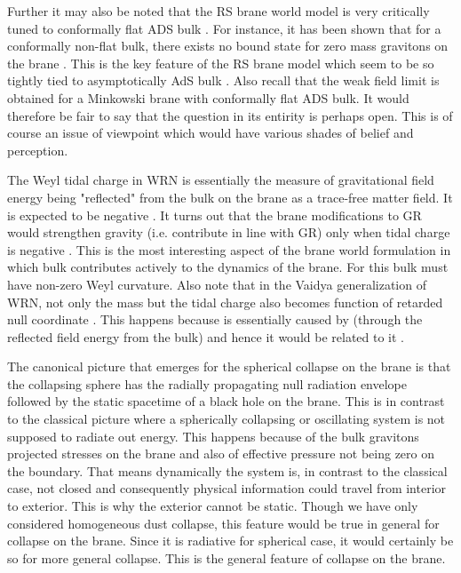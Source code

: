 \documentclass[a4paper,twocolumn,showpacs,preprintnumbers,amsmath,amssymb]{revtex4}
\begin{document}
Further it may also be noted that the RS brane world model is very critically 
tuned to conformally flat ADS\coordHE{} bulk \cite{sd,n9}. For instance, it has 
been shown that for a conformally non-flat bulk, there exists no bound state 
for zero mass gravitons on the brane \cite{sd}. This is the key feature of 
the RS brane model which seem to be so tightly tied to asymptotically AdS bulk \cite{pn}. 
Also recall that the weak field limit is obtained for a Minkowski brane 
with conformally flat ADS\coordHE{} bulk. It would therefore be fair to say that 
the question in its entirity is perhaps open. This is of course an issue of 
viewpoint which would have various shades of belief and perception.

The Weyl tidal charge in WRN is essentially the measure of gravitational
field energy being "reflected" from the bulk on the brane as a trace-free
matter field. It is expected to be negative \cite{r2,r6,d}. It turns out that 
the brane modifications to GR would strengthen gravity (i.e. contribute in 
line with GR) only when tidal charge is negative \cite{d}. This is the most 
interesting aspect of the brane world formulation in which bulk contributes 
actively to the dynamics of the brane. For this bulk must have non-zero Weyl 
curvature. Also note that in the Vaidya generalization of WRN, not only the 
mass \coordHE{} but the tidal charge \coordHE{} also becomes function of retarded null 
coordinate \coordHE{}. This happens because \coordHE{} is essentially caused by \coordHE{} (through 
the reflected field energy from the bulk) and hence it would be related to it 
\cite{r2,r6,d}.

The canonical picture that emerges for the spherical collapse on the brane 
is that the collapsing sphere has the radially propagating null radiation
envelope followed by the static spacetime of a black hole on the brane. This 
is in contrast to the classical picture where a spherically collapsing or 
oscillating system is not supposed to radiate out energy. This happens 
because of the bulk gravitons projected stresses on the brane and also of  
effective pressure not being zero on the boundary. That means dynamically the 
system is, in contrast to the classical case, not closed and consequently 
physical information could travel from interior to exterior. This is why the 
exterior cannot be static. Though we have only considered homogeneous dust 
collapse, this feature would be true in general for collapse on the brane.
Since it is radiative for spherical case, it would certainly be so for more 
general collapse. This is the general feature of collapse on the brane. 
\end{document}
